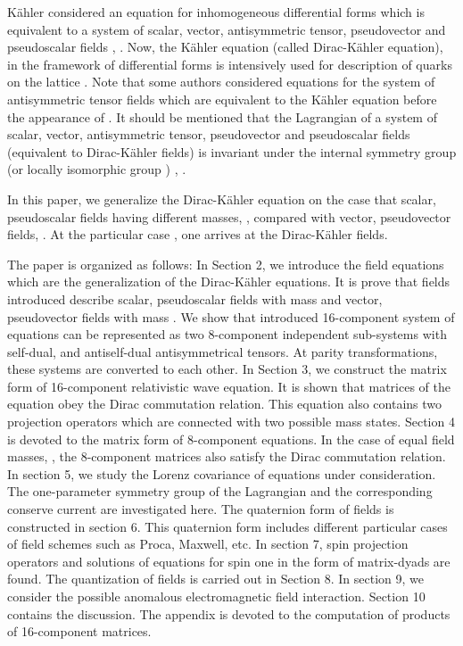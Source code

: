 \documentclass[a4paper,12pt]{article}
\begin{document}
K\"ahler \cite{Kahler} considered an equation for inhomogeneous
differential forms which is equivalent to a system of scalar,
vector, antisymmetric tensor, pseudovector and pseudoscalar fields
\cite{Kruglov1}, \cite{monogr}. Now, the K\"ahler equation (called
Dirac-K\"ahler equation), in the framework of differential forms
is intensively used for description of quarks on the lattice
\cite{Becher}. Note that some authors \cite{Ivanenko} considered
equations for the system of antisymmetric tensor fields which are
equivalent to the K\"ahler equation before the appearance of
\cite{Kahler}. It should be mentioned that the Lagrangian of a
system of scalar, vector, antisymmetric tensor, pseudovector and
pseudoscalar fields (equivalent to Dirac-K\"ahler fields) is
invariant under the internal symmetry group \coordHE{} (or locally
isomorphic group \coordHE{}) \cite{Kruglov1}, \cite{monogr}.

In this paper, we generalize the Dirac-K\"ahler equation on the
case that scalar, pseudoscalar fields having different masses,
\coordHE{}, compared with vector, pseudovector fields, \coordHE{}. At the
particular case \coordHE{}, one arrives at the Dirac-K\"ahler fields.

The paper is organized as follows: In Section 2, we introduce the
field equations which are the generalization of the Dirac-K\"ahler
equations. It is prove that fields introduced describe scalar,
pseudoscalar fields with mass \coordHE{} and vector, pseudovector
fields with mass \coordHE{}. We show that introduced 16-component system
of equations can be represented as two 8-component independent
sub-systems with self-dual, and antiself-dual antisymmetrical
tensors. At parity transformations, these systems are converted to
each other. In Section 3, we construct the matrix form of
16-component relativistic wave equation. It is shown that matrices
of the equation obey the Dirac commutation relation. This equation
also contains two projection operators which are connected with
two possible mass states. Section 4 is devoted to the matrix form
of 8-component equations. In the case of equal field masses,
\coordHE{}, the 8-component matrices also satisfy the Dirac
commutation relation. In section 5, we study the Lorenz covariance
of equations under consideration. The one-parameter symmetry group
of the Lagrangian and the corresponding conserve current are
investigated here. The quaternion form of fields is constructed in
section 6. This quaternion form includes different particular
cases of field schemes such as Proca, Maxwell, etc. In section 7,
spin projection operators and solutions of equations for spin one
in the form of matrix-dyads are found. The quantization of fields
is carried out in Section 8. In section 9, we consider the
possible anomalous electromagnetic field interaction. Section 10
contains the discussion. The appendix is devoted to the
computation of products of 16-component matrices.
\end{document}
